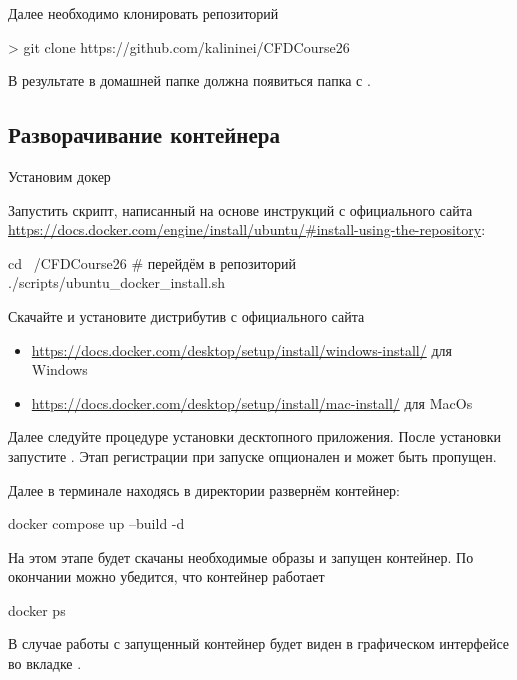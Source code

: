Далее необходимо клонировать репозиторий

\begin{shelloutput}
> git clone https://github.com/kalininei/CFDCourse26
\end{shelloutput}

В результате в домашней папке должна появиться папка с .

\subsection{Разворачивание контейнера}

Установим докер

\begin{tcolorbox}[osstyle, title=Ubuntu+apt]
Запустить скрипт, написанный на основе инструкций с официального сайта \url{https://docs.docker.com/engine/install/ubuntu/#install-using-the-repository}:
\begin{shelloutput}
cd ~/CFDCourse26    # перейдём в репозиторий
./scripts/ubuntu_docker_install.sh
\end{shelloutput}
\end{tcolorbox}

\begin{tcolorbox}[osstyle, title=Windows/MacOs+DockerDesktop]
Скачайте и установите дистрибутив с официального сайта 
\begin{itemize}
\item \url{https://docs.docker.com/desktop/setup/install/windows-install/} для Windows
\item \url{https://docs.docker.com/desktop/setup/install/mac-install/} для MacOs
\end{itemize}
Далее следуйте процедуре установки десктопного приложения.
После установки запустите .
Этап регистрации при запуске опционален и может быть пропущен.
\end{tcolorbox}

Далее в терминале находясь в директории  развернём контейнер:
\begin{shelloutput}
docker compose up --build -d
\end{shelloutput}
На этом этапе будет скачаны необходимые образы и запущен контейнер.
По окончании можно убедится, что контейнер работает
\begin{shelloutput}
docker ps
\end{shelloutput}
В случае работы с  запущенный контейнер будет виден в графическом интерфейсе во вкладке .

